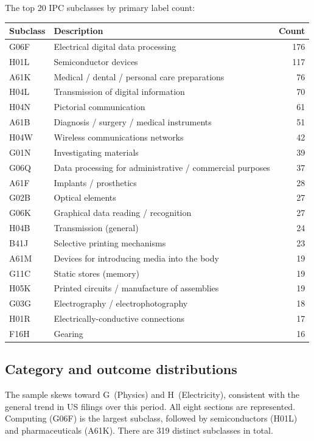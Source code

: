 \documentclass[11pt]{article}
\begin{document}
The top 20 IPC subclasses by primary label count:

\begin{center}
\small
\begin{tabular}{llr}
  \toprule
  \textbf{Subclass} & \textbf{Description} & \textbf{Count} \\
  \midrule
  G06F & Electrical digital data processing & 176 \\
  H01L & Semiconductor devices & 117 \\
  A61K & Medical / dental / personal care preparations & 76 \\
  H04L & Transmission of digital information & 70 \\
  H04N & Pictorial communication & 61 \\
  A61B & Diagnosis / surgery / medical instruments & 51 \\
  H04W & Wireless communications networks & 42 \\
  G01N & Investigating materials & 39 \\
  G06Q & Data processing for administrative / commercial purposes & 37 \\
  A61F & Implants / prosthetics & 28 \\
  G02B & Optical elements & 27 \\
  G06K & Graphical data reading / recognition & 27 \\
  H04B & Transmission (general) & 24 \\
  B41J & Selective printing mechanisms & 23 \\
  A61M & Devices for introducing media into the body & 19 \\
  G11C & Static stores (memory) & 19 \\
  H05K & Printed circuits / manufacture of assemblies & 19 \\
  G03G & Electrography / electrophotography & 18 \\
  H01R & Electrically-conductive connections & 17 \\
  F16H & Gearing & 16 \\
  \bottomrule
\end{tabular}
\end{center}

\subsection{Category and outcome distributions}

The sample skews toward G~(Physics) and H~(Electricity), consistent with the general
trend in US filings over this period. All eight sections are represented. Computing
(G06F) is the largest subclass, followed by semiconductors (H01L) and pharmaceuticals
(A61K). There are 319 distinct subclasses in total.
\end{document}
